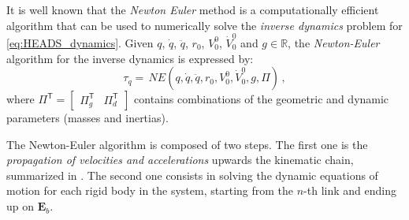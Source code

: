It is well known that the \textit{Newton Euler} method is a computationally efficient algorithm that can be used to numerically solve the \textit{inverse dynamics} problem for \eqref{eq:HEADS_dynamics}.
%
%
Given $q$, $\dot{q}$, $\ddot{q}$, $r_{0}$, $V^{0}_{0}$, $\dot{V}^{0}_{0}$ and $g \in \mathbb{R}$, the \textit{Newton-Euler} algorithm for the inverse dynamics is expressed by:
%
\begin{equation}
\tau_q = \, NE( q, \dot{q}, \ddot{q}, r_{0}, V^{0}_{0}, \dot{V}^{0}_{0}, g, \Pi ) \,,
\label{eq:NE_algorithm}
\end{equation}
%
where $\Pi^\mathsf{T} = \left[\!\!\begin{array}{cc} \Pi^\mathsf{T}_{g} & \Pi^\mathsf{T}_{d} \end{array}\!\!\right]$ contains combinations of the geometric and dynamic parameters (masses and inertias).


The Newton-Euler algorithm is composed of two steps. The first one is the \textit{propagation of velocities and accelerations} upwards the kinematic chain, summarized in . The second one consists in solving the dynamic equations of motion for each rigid body in the system, starting from the $n$-th link and ending up on $\mathbf{E}_b$. 


